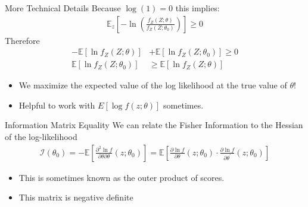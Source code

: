 \documentclass[aspectratio=169]{beamer}
\begin{document}
\begin{frame}{More Technical Details}
Because $\log(1)=0$ this implies:
\begin{align*}
\mathbb { E }_z \left[ - \ln \left( \frac { f _ { Z } ( Z ; \theta ) } { f _ { Z } \left( Z ; \theta _ { 0 } \right) } \right) \right] \geq 0
\end{align*}
Therefore 
\begin{align*}
- \mathbb { E } \left[ \ln f _ { Z } ( Z ; \theta ) \right] &+ \mathbb { E } \left[ \ln f _ { Z } \left( Z ; \theta _ { 0 } \right) \right] \geq 0\\
\mathbb { E } \left[ \ln f _ { Z } \left( Z ; \theta _ { 0 } \right) \right] &\geq \mathbb { E } \left[ \ln f _ { Z } ( Z ; \theta ) \right]
\end{align*}
\begin{itemize}
\item We maximize the expected value of the log likelihood at the true value of $\theta$!
\item Helpful to work with $E[\log f(z; \theta)]$ sometimes.
\end{itemize}
\end{frame}


\begin{frame}{Information Matrix Equality}
We can relate the \alert{Fisher Information} to the Hessian of the log-likelihood
\begin{align*}
\mathcal { I } \left( \theta _ { 0 } \right) = - \mathbb { E } \left[ \frac { \partial ^ { 2 } \ln f } { \partial \theta \partial \theta } \left( z ; \theta _ { 0 } \right) \right] = \mathbb { E } \left[ \frac { \partial \ln f } { \partial \theta } \left( z ; \theta _ { 0 } \right) \cdot \frac { \partial \ln f } { \partial \theta ^ { \prime } } \left( z ; \theta _ { 0 } \right) \right]
\end{align*}
\begin{itemize}
    \item This is sometimes known as the \alert{outer product of scores}.
    \item This matrix is \alert{negative definite}
\end{itemize}
\end{frame}
\end{document}
